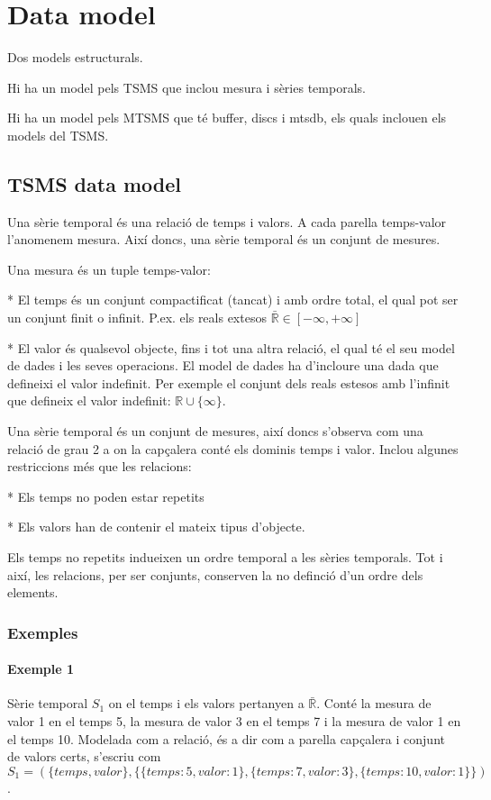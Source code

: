 
\section{Data model}

Dos models estructurals.

Hi ha un model pels TSMS que inclou mesura i sèries temporals.

Hi ha un model pels MTSMS que té buffer, discs i mtsdb, els quals inclouen els models del TSMS.


\subsection{TSMS data model}

Una sèrie temporal és una relació de temps i valors. A cada parella temps-valor l'anomenem mesura. Així doncs, una sèrie temporal és un conjunt de mesures.

Una mesura és un tuple temps-valor:

* El temps és un conjunt compactificat (tancat) i amb ordre total, el qual pot ser un conjunt finit o infinit. P.ex. els reals extesos $\bar{\mathbb{R}} \in [-\infty,+\infty]$

* El valor és qualsevol objecte, fins i tot una altra relació, el qual té el seu model de dades i les seves operacions. El model de dades ha d'incloure una dada que defineixi el valor indefinit. Per exemple el conjunt dels reals estesos amb l'infinit que defineix el valor indefinit: $\mathbb{R} \cup \{\infty\}$. 


Una sèrie temporal és un conjunt de mesures, així doncs s'observa com una relació de grau 2 a on la capçalera conté els dominis temps i valor. Inclou algunes restriccions més que les relacions:

* Els temps no poden estar repetits

* Els valors han de contenir el mateix tipus d'objecte.

Els temps no repetits indueixen un ordre temporal a les sèries temporals. Tot i així, les relacions, per ser conjunts, conserven la no definció d'un ordre dels elements. 



\subsubsection{Exemples}

\paragraph{Exemple 1}
Sèrie temporal $S_1$ on el temps i els valors pertanyen a $\bar{\mathbb{R}}$. Conté la mesura de valor 1 en el temps 5, la mesura de valor 3 en el temps 7 i la mesura de valor 1 en el temps 10. Modelada com a relació, és a dir com a parella capçalera i conjunt de valors certs, s'escriu com 
$S_1 = ( \{temps,valor\}, \{ \{temps:5,valor:1\}, \{temps:7,valor:3\}, \{temps:10,valor:1\} \} )$.

